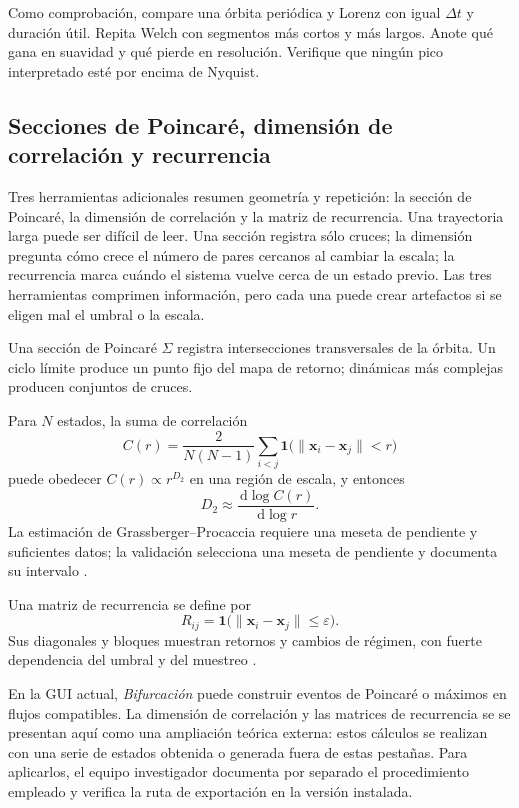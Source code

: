 \documentclass[11pt,a4paper]{article}
\newcommand{\gui}[1]{\textsf{\emph{#1}}}
\newcommand{\dd}{\,\mathrm{d}}
\begin{document}
Como comprobación, compare una órbita periódica y Lorenz con igual $\Delta t$ y
duración útil. Repita
Welch con segmentos más cortos y más largos. Anote qué gana en suavidad y qué pierde
en resolución. Verifique que ningún pico interpretado esté por encima de Nyquist.

\subsection{Secciones de Poincaré, dimensión de correlación y recurrencia}

Tres herramientas adicionales resumen geometría y repetición: la sección de Poincaré,
la dimensión de correlación y la matriz de recurrencia. Una trayectoria larga puede
ser difícil de leer. Una sección registra sólo cruces; la
dimensión pregunta cómo crece el número de pares cercanos al cambiar la escala; la
recurrencia marca cuándo el sistema vuelve cerca de un estado previo. Las tres
herramientas comprimen información, pero cada una puede crear artefactos si se eligen
mal el umbral o la escala.

Una sección de Poincaré $\Sigma$ registra intersecciones transversales de la órbita.
Un ciclo límite produce un punto fijo del mapa de retorno; dinámicas más complejas
producen conjuntos de cruces.

Para $N$ estados, la suma de correlación
\[
 C(r)=\frac{2}{N(N-1)}\sum_{i<j}
 \mathbf 1\bigl(\|\mathbf{x}_i-\mathbf{x}_j\|<r\bigr)
\]
puede obedecer $C(r)\propto r^{D_2}$ en una región de escala, y entonces
\[
 D_2\approx\frac{\dd\log C(r)}{\dd\log r}.
\]
La estimación de Grassberger--Procaccia requiere una meseta de pendiente y suficientes
datos; la validación selecciona una meseta de pendiente y documenta su intervalo \cite{grassberger1983}.

Una matriz de recurrencia se define por
\[
 R_{ij}=\mathbf 1\bigl(\|\mathbf{x}_i-\mathbf{x}_j\|\le\varepsilon\bigr).
\]
Sus diagonales y bloques muestran retornos y cambios de régimen, con fuerte
dependencia del umbral y del muestreo \cite{eckmann1987}.

En la GUI actual, \gui{Bifurcación} puede construir eventos de Poincaré o máximos en
flujos compatibles. La dimensión de correlación y las matrices de recurrencia se
se presentan aquí como una ampliación teórica externa: estos cálculos se realizan con
una serie de estados obtenida o generada fuera de estas pestañas. Para aplicarlos, el
equipo investigador documenta por separado el procedimiento empleado y verifica la
ruta de exportación en la versión instalada.
\end{document}

